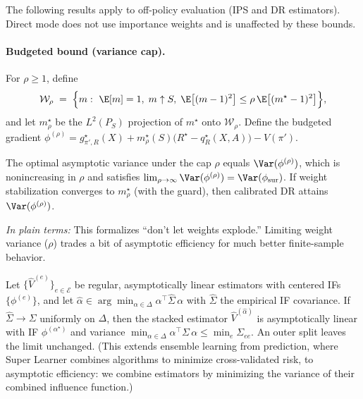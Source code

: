 The following results apply to off-policy evaluation (IPS and DR estimators). Direct mode does not use importance weights and is unaffected by these bounds.

\paragraph{Budgeted bound (variance cap).}
For $\rho\ge 1$, define
\[
\mathcal{W}_\rho \;=\; \Big\{ m:\ \E[m]=1,\; m\uparrow S,\; \E\big[(m-1)^2\big]\le
\rho\,\E\big[(m^\star-1)^2\big]\Big\},
\]
and let $m^\star_\rho$ be the $L^2(P_S)$ projection of $m^\star$ onto $\mathcal{W}_\rho$.
Define the budgeted gradient
$\phi^{(\rho)}= g^\star_{\pi',R}(X) + m^\star_\rho(S)\big(R^\star-q^\star_R(X,A)\big) - V(\pi')$.

\begin{theorem}
\label{thm:budgeted}
The optimal asymptotic variance under the cap $\rho$ equals $\Var(\phi^{(\rho)})$,
which is nonincreasing in $\rho$ and satisfies
$\lim_{\rho\to\infty}\Var(\phi^{(\rho)})=\Var(\phi_{\mathrm{sur}})$.
If weight stabilization converges to $m^\star_\rho$ (with the guard), then calibrated DR attains $\Var(\phi^{(\rho)})$.
\end{theorem}

\noindent\emph{In plain terms:} This formalizes ``don't let weights explode.'' Limiting weight variance ($\rho$) trades a bit of asymptotic efficiency for much better finite-sample behavior.

\begin{theorem}
\label{thm:stack}
Let $\{\widehat V^{(e)}\}_{e\in\mathcal{E}}$ be regular, asymptotically linear estimators with centered IFs
$\{\phi^{(e)}\}$, and let $\hat\alpha\in\arg\min_{\alpha\in\Delta}\alpha^\top \hat\Sigma\,\alpha$ with
$\hat\Sigma$ the empirical IF covariance. If $\hat\Sigma\to \Sigma$ uniformly on $\Delta$, then the
stacked estimator $\widehat V^{(\hat\alpha)}$ is asymptotically linear with IF $\phi^{(\alpha^\star)}$ and
variance $\min_{\alpha\in\Delta}\alpha^\top \Sigma\,\alpha\le \min_e \Sigma_{ee}$.
An outer split leaves the limit unchanged. (This extends ensemble learning from prediction, where Super Learner \citep{vanderLaan2007SuperLearner} combines algorithms to minimize cross-validated risk, to asymptotic efficiency: we combine estimators by minimizing the variance of their combined influence function.)
\end{theorem}

